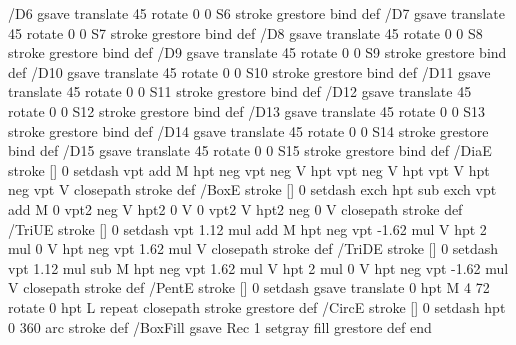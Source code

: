{/D6 { gsave translate 45 rotate 0 0 S6 stroke grestore } bind def
/D7 { gsave translate 45 rotate 0 0 S7 stroke grestore } bind def
/D8 { gsave translate 45 rotate 0 0 S8 stroke grestore } bind def
/D9 { gsave translate 45 rotate 0 0 S9 stroke grestore } bind def
/D10 { gsave translate 45 rotate 0 0 S10 stroke grestore } bind def
/D11 { gsave translate 45 rotate 0 0 S11 stroke grestore } bind def
/D12 { gsave translate 45 rotate 0 0 S12 stroke grestore } bind def
/D13 { gsave translate 45 rotate 0 0 S13 stroke grestore } bind def
/D14 { gsave translate 45 rotate 0 0 S14 stroke grestore } bind def
/D15 { gsave translate 45 rotate 0 0 S15 stroke grestore } bind def
/DiaE { stroke [] 0 setdash vpt add M
  hpt neg vpt neg V hpt vpt neg V
  hpt vpt V hpt neg vpt V closepath stroke } def
/BoxE { stroke [] 0 setdash exch hpt sub exch vpt add M
  0 vpt2 neg V hpt2 0 V 0 vpt2 V
  hpt2 neg 0 V closepath stroke } def
/TriUE { stroke [] 0 setdash vpt 1.12 mul add M
  hpt neg vpt -1.62 mul V
  hpt 2 mul 0 V
  hpt neg vpt 1.62 mul V closepath stroke } def
/TriDE { stroke [] 0 setdash vpt 1.12 mul sub M
  hpt neg vpt 1.62 mul V
  hpt 2 mul 0 V
  hpt neg vpt -1.62 mul V closepath stroke } def
/PentE { stroke [] 0 setdash gsave
  translate 0 hpt M 4 {72 rotate 0 hpt L} repeat
  closepath stroke grestore } def
/CircE { stroke [] 0 setdash 
  hpt 0 360 arc stroke } def
/BoxFill { gsave Rec 1 setgray fill grestore } def
end
}

